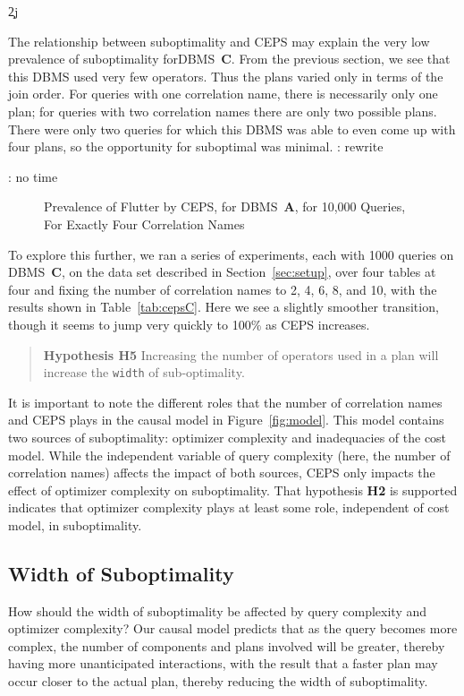 \c2j{}{
The relationship between suboptimality and CEPS may explain the very low 
prevalence of suboptimality for\linebreak DBMS~{\bf C}. From
the previous section, we see that this DBMS used very few operators. Thus
the plans varied only in terms of the join order. For queries with one
correlation name, there is necessarily only one plan; for queries with two
correlation names there are only two possible plans. There were only two
queries for which this DBMS was able to even come up with four plans, so the
opportunity for suboptimal was minimal.
 {\todo: rewrite}

{\todo: no time}
\begin{figure}
\begin{center}
\end{center}
\caption{Prevalence of Flutter by CEPS, for DBMS~{\bf A}, for 10,000
  Queries, For Exactly Four Correlation Names\label{fig:ceps10K}}
\end{figure}

To explore this further, we ran a series of experiments, each with 1000
queries on DBMS~{\bf C}, on the data set described in Section~\ref{sec:setup}, over four tables at four and fixing the
number of correlation names to
2, 4, 6, 8, and 10, with the results shown in Table~\ref{tab:cepsC}. Here
we see a slightly smoother transition, though it seems to jump very quickly
to 100\% as CEPS increases.

\begin{quote}
{\bf Hypothesis H5} Increasing the number of operators used in a plan will
increase the {\tt width} of sub-optimality.
\end{quote}
}

It is important to note the different roles that the number of correlation
names and CEPS plays in the causal model in Figure~\ref{fig:model}.
This model contains two sources of suboptimality: optimizer complexity and
inadequacies of the cost model. While the independent variable of query
complexity (here, the number of correlation names) affects the impact of
both sources, CEPS only impacts the effect of optimizer complexity on
suboptimality. That hypothesis {\bf H2} is supported indicates that
optimizer complexity plays at least some role, independent of cost model, in
suboptimality.

\subsection{Width of Suboptimality}
How should the width of suboptimality be affected by query complexity and optimizer
complexity? Our causal model predicts that as the query becomes more
complex, the number of components and plans involved will be greater,
thereby having more unanticipated interactions, with the result that a
faster plan may occur closer to the actual plan, thereby reducing the width
of suboptimality.

